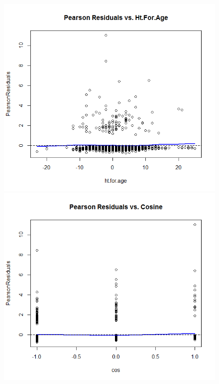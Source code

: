 \documentclass[11pt]{article}
\begin{document}
\begin{enumerate}
\begin{figure}[H]
		\includegraphics[scale=0.4]{Rplot4-mean3}
		\includegraphics[scale=0.4]{Rplot4-mean4}
	\end{figure}
	\clearpage
	\begin{figure}[H]

\end{figure}
\end{enumerate}
\end{document}
